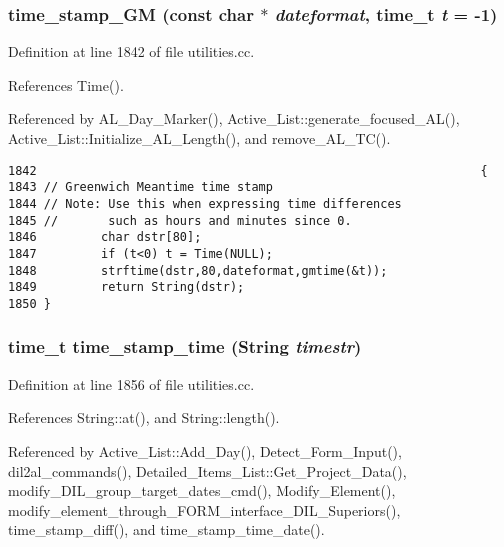 \subsubsection{ time\_\-stamp\_\-GM (const char $\ast$ {\em dateformat}, time\_\-t {\em t} = -1)}\label{dil2al_8hh_a219}




Definition at line 1842 of file utilities.cc.

References Time().

Referenced by AL\_\-Day\_\-Marker(), Active\_\-List::generate\_\-focused\_\-AL(), Active\_\-List::Initialize\_\-AL\_\-Length(), and remove\_\-AL\_\-TC().



\footnotesize\begin{verbatim}1842                                                              {
1843 // Greenwich Meantime time stamp
1844 // Note: Use this when expressing time differences
1845 //       such as hours and minutes since 0.
1846         char dstr[80];
1847         if (t<0) t = Time(NULL);
1848         strftime(dstr,80,dateformat,gmtime(&t));
1849         return String(dstr);
1850 }
\end{verbatim}\normalsize 
{}
\subsubsection{\setlength{\rightskip}{0pt plus 5cm}time\_\-t time\_\-stamp\_\-time ({\bf String} {\em timestr})}\label{dil2al_8hh_a221}




Definition at line 1856 of file utilities.cc.

References String::at(), and String::length().

Referenced by Active\_\-List::Add\_\-Day(), Detect\_\-Form\_\-Input(), dil2al\_\-commands(), Detailed\_\-Items\_\-List::Get\_\-Project\_\-Data(), modify\_\-DIL\_\-group\_\-target\_\-dates\_\-cmd(), Modify\_\-Element(), modify\_\-element\_\-through\_\-FORM\_\-interface\_\-DIL\_\-Superiors(), time\_\-stamp\_\-diff(), and time\_\-stamp\_\-time\_\-date().



